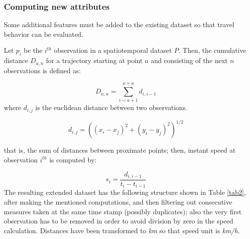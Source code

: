 \documentclass[]{elsarticle} %
\begin{document}
\hypertarget{computing-new-attributes}{%
\subsubsection{Computing new
attributes}\label{computing-new-attributes}}

Some additional features must be added to the existing dataset so that
travel behavior can be evaluated.

Let \(p_i\) be the \(i^{th}\) observation in a spatiotemporal dataset
\(P\). Then, the cumulative distance \(D_{a,n}\) for a trajectory
starting at point \(a\) and consisting of the next \(n\) observations is
defined as:

\[ D_{a,n}=\sum_{i=a+1}^{a+n}d_{i, i-1} \] where \(d_{i,j}\) is the
euclidean distance between two observations.

\[ d_{i,j}=((x_i-x_{j})^2+(y_i-y_{j})^2)^{1/2} \]

that is, the sum of distances between proximate points; then, instant
speed at observation \(i^{th}\) is computed by:

\[ s_{i} = \frac{d_{i,i-1}}{t_{i}-t_{i-1}} \] The resulting extended
dataset has the following structure shown in Table \ref{tab2}, after
making the mentioned computations, and then filtering out consecutive
measures taken at the same time stamp (possibly duplicates); also the
very first observation has to be removed in order to avoid division by
zero in the speed calculation. Distances have been transformed to
\emph{km} so that speed unit is \emph{km/h}.
\end{document}
